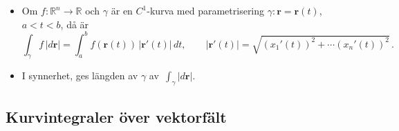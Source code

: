 \documentclass{article}
\newcommand\bdr{\mathbf r}
\def\Rone{{\mathbb R}}
\begin{document}
\begin{itemize}

   \item 
        {Om}
     $f:\Rone^n\to\Rone$
        {och}
     $\gamma$
        {är en $C^1$-kurva med parametrisering}
     $\gamma: \bdr=\bdr(t)$, $a < t < b$,
        {då är}
     $$
     \int_\gamma f\,|d\bdr| = \int_a^b f(\bdr(t))\, |\bdr'(t)|\,dt,
     \qquad  |\bdr'(t)| = \sqrt{(x_1'(t))^2+\cdots (x_n'(t))^2}\,.
     $$%

   \item 
        {I synnerhet, ges längden av}
     $\gamma$  
        {av}
     \,$\int_\gamma |d\bdr|$.

\end{itemize}

\subsection*{
   {Kurvintegraler över vektorfält}
}
\end{document}
